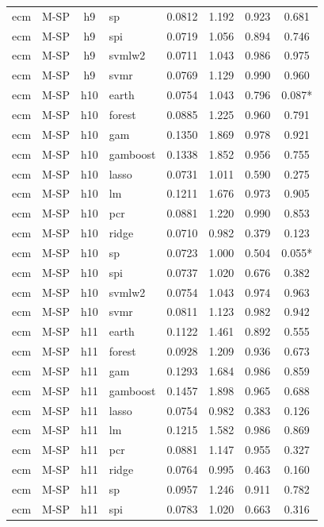\begin{ThreePartTable}
\begin{longtable}[t]{llclcccc}
ecm & M-SP & h9 & sp & 0.0812 & 1.192 & 0.923 & 0.681\\
ecm & M-SP & h9 & spi & 0.0719 & 1.056 & 0.894 & 0.746\\
ecm & M-SP & h9 & svmlw2 & 0.0711 & 1.043 & 0.986 & 0.975\\
ecm & M-SP & h9 & svmr & 0.0769 & 1.129 & 0.990 & 0.960\\
\addlinespace
ecm & M-SP & h10 & earth & 0.0754 & 1.043 & 0.796 & 0.087*\\
ecm & M-SP & h10 & forest & 0.0885 & 1.225 & 0.960 & 0.791\\
ecm & M-SP & h10 & gam & 0.1350 & 1.869 & 0.978 & 0.921\\
ecm & M-SP & h10 & gamboost & 0.1338 & 1.852 & 0.956 & 0.755\\
ecm & M-SP & h10 & lasso & 0.0731 & 1.011 & 0.590 & 0.275\\
ecm & M-SP & h10 & lm & 0.1211 & 1.676 & 0.973 & 0.905\\
ecm & M-SP & h10 & pcr & 0.0881 & 1.220 & 0.990 & 0.853\\
ecm & M-SP & h10 & ridge & 0.0710 & 0.982 & 0.379 & 0.123\\
ecm & M-SP & h10 & sp & 0.0723 & 1.000 & 0.504 & 0.055*\\
ecm & M-SP & h10 & spi & 0.0737 & 1.020 & 0.676 & 0.382\\
ecm & M-SP & h10 & svmlw2 & 0.0754 & 1.043 & 0.974 & 0.963\\
ecm & M-SP & h10 & svmr & 0.0811 & 1.123 & 0.982 & 0.942\\
\addlinespace
ecm & M-SP & h11 & earth & 0.1122 & 1.461 & 0.892 & 0.555\\
ecm & M-SP & h11 & forest & 0.0928 & 1.209 & 0.936 & 0.673\\
ecm & M-SP & h11 & gam & 0.1293 & 1.684 & 0.986 & 0.859\\
ecm & M-SP & h11 & gamboost & 0.1457 & 1.898 & 0.965 & 0.688\\
ecm & M-SP & h11 & lasso & 0.0754 & 0.982 & 0.383 & 0.126\\
ecm & M-SP & h11 & lm & 0.1215 & 1.582 & 0.986 & 0.869\\
ecm & M-SP & h11 & pcr & 0.0881 & 1.147 & 0.955 & 0.327\\
ecm & M-SP & h11 & ridge & 0.0764 & 0.995 & 0.463 & 0.160\\
ecm & M-SP & h11 & sp & 0.0957 & 1.246 & 0.911 & 0.782\\
ecm & M-SP & h11 & spi & 0.0783 & 1.020 & 0.663 & 0.316\\

\end{longtable}
\end{ThreePartTable}
